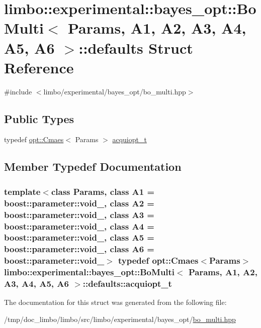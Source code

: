 \hypertarget{structlimbo_1_1experimental_1_1bayes__opt_1_1_bo_multi_1_1defaults}{}\section{limbo\+:\+:experimental\+:\+:bayes\+\_\+opt\+:\+:Bo\+Multi$<$ Params, A1, A2, A3, A4, A5, A6 $>$\+:\+:defaults Struct Reference}
\label{structlimbo_1_1experimental_1_1bayes__opt_1_1_bo_multi_1_1defaults}


{\ttfamily \#include $<$limbo/experimental/bayes\+\_\+opt/bo\+\_\+multi.\+hpp$>$}

\subsection*{Public Types}
\begin{DoxyCompactItemize}
\item 
typedef \hyperlink{structlimbo_1_1opt_1_1_cmaes}{opt\+::\+Cmaes}$<$ Params $>$ \hyperlink{structlimbo_1_1experimental_1_1bayes__opt_1_1_bo_multi_1_1defaults_a24be1814310958ec5808cb9856cf8c74}{acquiopt\+\_\+t}
\end{DoxyCompactItemize}


\subsection{Member Typedef Documentation}
\hypertarget{structlimbo_1_1experimental_1_1bayes__opt_1_1_bo_multi_1_1defaults_a24be1814310958ec5808cb9856cf8c74}{}
\subsubsection[{acquiopt\+\_\+t}]{\setlength{\rightskip}{0pt plus 5cm}template$<$class Params, class A1 = boost\+::parameter\+::void\+\_\+, class A2 = boost\+::parameter\+::void\+\_\+, class A3 = boost\+::parameter\+::void\+\_\+, class A4 = boost\+::parameter\+::void\+\_\+, class A5 = boost\+::parameter\+::void\+\_\+, class A6 = boost\+::parameter\+::void\+\_\+$>$ typedef {\bf opt\+::\+Cmaes}$<$Params$>$ {\bf limbo\+::experimental\+::bayes\+\_\+opt\+::\+Bo\+Multi}$<$ Params, A1, A2, A3, A4, A5, A6 $>$\+::{\bf defaults\+::acquiopt\+\_\+t}}\label{structlimbo_1_1experimental_1_1bayes__opt_1_1_bo_multi_1_1defaults_a24be1814310958ec5808cb9856cf8c74}


The documentation for this struct was generated from the following file\+:\begin{DoxyCompactItemize}
\item 
/tmp/doc\+\_\+limbo/limbo/src/limbo/experimental/bayes\+\_\+opt/\hyperlink{bo__multi_8hpp}{bo\+\_\+multi.\+hpp}\end{DoxyCompactItemize}
